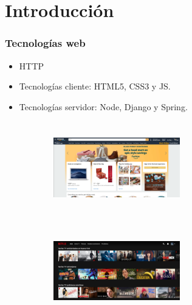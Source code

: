 \documentclass[xcolor={table}]{beamer}
\begin{document}
	\section{Introducción}
		\begin{frame}

			\frametitle{Tecnologías web}
			\begin{itemize}
			    \begin{itemize}
    			    \item HTTP
    			    \item Tecnologías cliente: HTML5, CSS3 y JS. 
    			    \item Tecnologías servidor: Node, Django y Spring. 
			    \end{itemize}{}
			\end{itemize}
			
		\begin{figure}[H]
        \centering
        \begin{subfigure}{\textwidth}
            \includegraphics[width=5.5cm, height=4cm]{img/amazon.png}
        \label{fig:amazon}
        \end{subfigure}\hfill
        \begin{subfigure}{\textwidth}
            \includegraphics[width=5.5cm, height=4cm]{img/netflix.png}
        \label{fig:netflix}
        \end{subfigure}\hfill
            \label{fig:appwebs}
            \end{figure}
		\end{frame}
		
\end{document}
